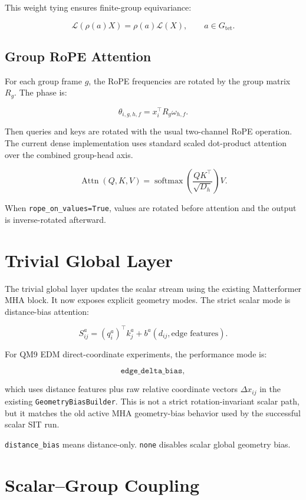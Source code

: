 \documentclass[11pt]{article}
\begin{document}
This weight tying ensures finite-group equivariance:

\[
  \mathcal{L}(\rho(a)X)
  =
  \rho(a)\mathcal{L}(X),
  \qquad a\in G_{\mathrm{tet}}.
\]

\subsection{Group RoPE Attention}

For each group frame \(g\), the RoPE frequencies are rotated by the group
matrix \(R_g\).  The phase is:

\[
  \theta_{i,g,h,f}
  =
  x_i^\top
  R_g\omega_{h,f}.
\]

Then queries and keys are rotated with the usual two-channel RoPE operation.
The current dense implementation uses standard scaled dot-product attention over
the combined group-head axis.

\[
  \operatorname{Attn}(Q,K,V)
  =
  \operatorname{softmax}
  \left(
    \frac{QK^\top}{\sqrt{D_h}}
  \right)V.
\]

When \texttt{rope\_on\_values=True}, values are rotated before attention and
the output is inverse-rotated afterward.

\section{Trivial Global Layer}

The trivial global layer updates the scalar stream using the existing
Matterformer MHA block.  It now exposes explicit geometry modes.  The strict
scalar mode is distance-bias attention:

\[
  S_{ij}^{a}
  =
  (q_i^a)^\top k_j^a
  +
  b^a(d_{ij}, \text{edge features}).
\]

For QM9 EDM direct-coordinate experiments, the performance mode is:

\[
  \texttt{edge\_delta\_bias},
\]

which uses distance features plus raw relative coordinate vectors
\(\Delta x_{ij}\) in the existing \texttt{GeometryBiasBuilder}.  This is not a
strict rotation-invariant scalar path, but it matches the old active MHA
geometry-bias behavior used by the successful scalar SIT run.

\texttt{distance\_bias} means distance-only.  \texttt{none} disables scalar
global geometry bias.

\section{Scalar--Group Coupling}
\end{document}
